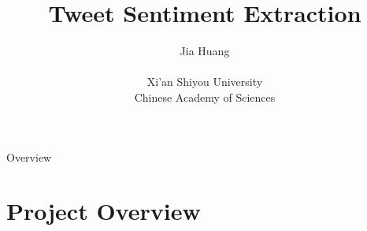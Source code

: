\documentclass[
 size=14pt,
 paper=smartboard,  %
 mode=present, 		%
 display=slides, 	%
 style=tuliplab,  	%
 pauseslide,
 fleqn,leqno]{powerdot}
\title{Tweet Sentiment Extraction}
\author{
Jia Huang
\\
\\Xi'an Shiyou University
\\Chinese Academy of Sciences
}
\begin{document}
\maketitle



\begin{slide}[toc=,bm=]{Overview}
\tableofcontents[content=currentsection,type=1]
\end{slide}


\section{Project Overview}
\end{document}
